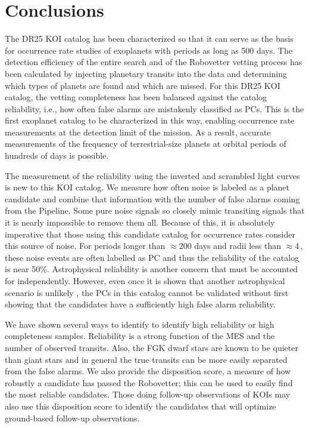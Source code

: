 

\section{Conclusions}
\label{s:conclusions}

The DR25 KOI catalog has been characterized so that it can serve as the basis for occurrence rate studies of exoplanets with periods as long as 500 days. The detection efficiency of the entire search \citep{Burke2017b,Christiansen2017} and of the Robovetter vetting process \citep{Coughlin2017a} has been calculated by injecting planetary transits into the data and determining which types of planets are found and which are missed. For this DR25 KOI catalog, the vetting completeness has been balanced against the catalog reliability, i.e., how often false alarms are mistakenly classified as PCs. This is the first \Kepler{} exoplanet catalog to be characterized in this way, enabling occurrence rate measurements at the detection limit of the mission.  As a result, accurate measurements of the frequency of terrestrial-size planets at orbital periods of hundreds of days is possible.

The measurement of the reliability using the inverted and scrambled light curves is new to this KOI catalog. We measure how often noise is labeled as a planet candidate and combine that information with the number of false alarms coming from the \Kepler{} Pipeline. Some pure noise signals so closely mimic transiting signals that it is nearly impossible to remove them all. Because of this, it is absolutely imperative that those using this candidate catalog for occurrence rates consider this source of noise. For periods longer than $\approx$200 days and radii less than $\approx$4\,\Rearth, these noise events are often labelled as PC and thus the reliability of the catalog is near 50\%.  Astrophysical reliability is another concern that must be accounted for independently.  However, even once it is shown that another astrophysical scenario is unlikely \citep[as was done for the DR24 KOIs in][]{Morton2016}, the PCs in this catalog cannot be validated without first showing that the candidates have a sufficiently high false alarm reliability. 

We have shown several ways to identify to identify high reliability or high completeness samples. Reliability is a strong function of the MES and the number of observed transits. Also, the FGK dwarf stars are known to be quieter than giant stars and in general the true transits can be more easily separated from the false alarms. We also provide the disposition score, a measure of how robustly a candidate has passed the Robovetter; this can be used to easily find the most reliable candidates. Those doing follow-up observations of KOIs may also use this disposition score to identify the candidates that will optimize ground-based follow-up observations.  

